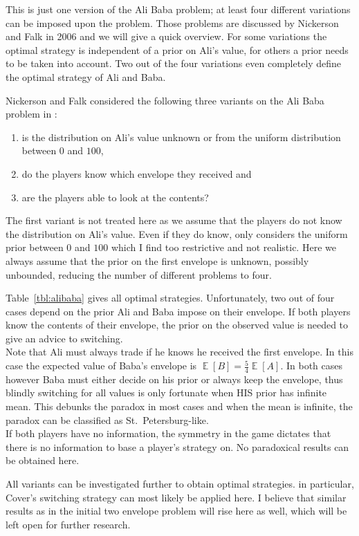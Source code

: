\documentclass[a4paper]{report}
\theoremstyle{plain}
\theoremstyle{definition}
\theoremstyle{remark}
\numberwithin{equation}{chapter}
\DeclareMathOperator{\E}{\mathbb{E}}
\DeclareMathOperator{\1}{\mathbbm{1}}
\begin{document}
This is just one version of the Ali Baba problem; at least four different variations can be imposed upon the problem. Those problems are discussed by Nickerson and Falk in 2006 \cite{Nickerson06} and we will give a quick overview. For some variations the optimal strategy is independent of a prior on Ali's value, for others a prior needs to be taken into account. Two out of the four variations even completely define the optimal strategy of Ali and Baba.

Nickerson and Falk considered the following three variants on the Ali Baba problem in \cite{Nickerson06}:
\begin{enumerate}
\item is the distribution on Ali's value unknown or from the uniform distribution between $0$ and $100$,
\item do the players know which envelope they received and
\item are the players able to look at the contents?
\end{enumerate}
The first variant is not treated here as we assume that the players do not know the distribution on Ali's value. Even if they do know, \cite{Nickerson06} only considers the uniform prior between $0$ and $100$ which I find too restrictive and not realistic. Here we always assume that the prior on the first envelope is unknown, possibly unbounded, reducing the number of different problems to four.

Table~\ref{tbl:alibaba} gives all optimal strategies. Unfortunately, two out of four cases depend on the prior Ali and Baba impose on their envelope. If both players know the contents of their envelope, the prior on the observed value is needed to give an advice to switching.\\
Note that Ali must always trade if he knows he received the first envelope. In this case the expected value of Baba's envelope is $\E[B]=\frac{5}{4}\E[A]$. In both cases however Baba must either decide on his prior or always keep the envelope, thus blindly switching for all values is only fortunate when HIS prior has infinite mean. This debunks the paradox in most cases and when the mean is infinite, the paradox can be classified as St.~Petersburg-like.\\
If both players have no information, the symmetry in the game dictates that there is no information to base a player's strategy on. No paradoxical results can be obtained here.

All variants can be investigated further to obtain optimal strategies. in particular, Cover's switching strategy can most likely be applied here. I believe that similar results as in the initial two envelope problem will rise here as well, which will be left open for further research.
\end{document}
